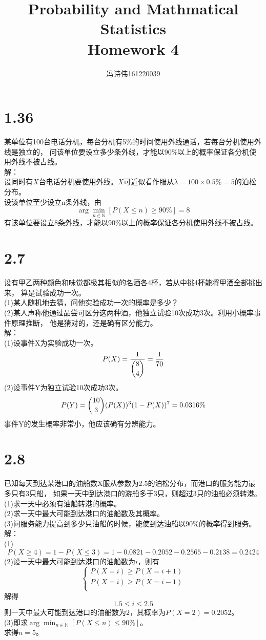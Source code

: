 \documentclass[a4papers]{ctexart}
\title{Probability and Mathmatical Statistics \\Homework 4}
\author{冯诗伟161220039}
\date{}
\begin{document}
\maketitle
\section{1.36}
某单位有100台电话分机，每台分机有5\%的时间使用外线通话，若每台分机使用外线是独立的，
问该单位要设立多少条外线，才能以90\%以上的概率保证各分机使用外线不被占线。\\
解：\\
设同时有$X$台电话分机要使用外线。$X$可近似看作服从$\lambda=100\times 0.5\%=5$的泊松分布。\\
设该单位至少设立n条外线，由
\[
    \arg \min_{n \in \mathbb{N}}\left[P(X\le n)\ge 90\% \right]=8
\]
有该单位要设立8条外线，才能以90\%以上的概率保证各分机使用外线不被占线。
\section{2.7}
设有甲乙两种颜色和味觉都极其相似的名酒各4杯，若从中挑4杯能将甲酒全部挑出来，
算是试验成功一次。\\
(1)某人随机地去猜，问他实验成功一次的概率是多少？\\
(2)某人声称他通过品尝可区分这两种酒，他独立试验10次成功3次。利用小概率事件原理推断，
他是猜对的，还是确有区分能力。\\
解：\\
(1)设事件X为实验成功一次。
\[P(X)=\dfrac{1}{\dbinom{8}{4}} = \dfrac{1}{70}\]
(2)设事件Y为独立试验10次成功3次。
\[P(Y)=\dbinom{10}{3}(P(X))^3(1-P(X))^7=0.0316\%\]
事件Y的发生概率非常小，他应该确有分辨能力。\\

\section{2.8}
已知每天到达某港口的油船数X服从参数为2.5的泊松分布，而港口的服务能力最多只有3只船，
如果一天中到达港口的游船多于3只，则超过3只的油船必须转港。\\
(1)求一天中必须有油船转港的概率。\\
(2)求一天中最大可能到达港口的油船数及其概率。\\
(3)问服务能力提高到多少只油船的时候，能使到达油船以90\%的概率得到服务。\\
解：\\
(1)\[P(X\ge4)=1-P(X\le3)=1-0.0821-0.2052-0.2565-0.2138=0.2424\]
(2)设一天中最大可能到达港口的油船数为$i$，则有\\
\[\begin{cases}
    P(X=i)\ge P(X=i+1)\\
    P(X=i)\ge P(X=i-1)\\
\end{cases}\]
解得\[1.5\le i \le 2.5\]
则一天中最大可能到达港口的油船数为$2$，其概率为$P(X=2)=0.2052$。\\
(3)即求$\arg\min_{n\in \mathbb{N}}\left[P(X \le n)\le 90\%\right]$。\\
求得$n=5$。
\end{document}
